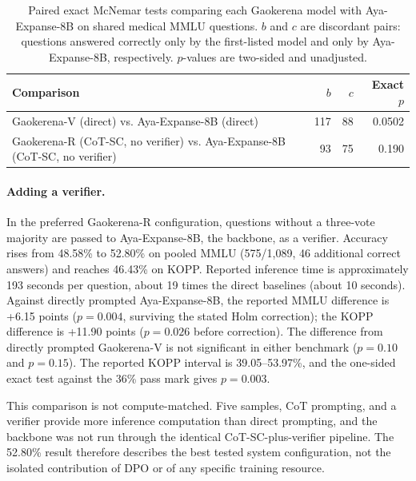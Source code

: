 \documentclass[manuscript,screen,review]{acmart}
\begin{document}
\begin{table}[ht]
\caption{Paired exact McNemar tests comparing each Gaokerena model with Aya-Expanse-8B on shared medical MMLU questions. $b$ and $c$ are discordant pairs: questions answered correctly only by the first-listed model and only by Aya-Expanse-8B, respectively. $p$-values are two-sided and unadjusted.}
\label{tab:mcnemar}
\small
\begin{tabular}{@{}lrrr@{}}
\toprule
Comparison & $b$ & $c$ & Exact $p$ \\
\midrule
Gaokerena-V (direct) vs. Aya-Expanse-8B (direct) & 117 & 88 & 0.0502 \\
Gaokerena-R (CoT-SC, no verifier) vs. Aya-Expanse-8B (CoT-SC, no verifier) & 93 & 75 & 0.190 \\
\bottomrule
\end{tabular}
\end{table}

\paragraph{Adding a verifier.} In the preferred Gaokerena-R configuration, questions without a three-vote majority are passed to Aya-Expanse-8B, the backbone, as a verifier. Accuracy rises from 48.58\% to 52.80\% on pooled MMLU (575/1,089, 46 additional correct answers) and reaches 46.43\% on KOPP. Reported inference time is approximately 193 seconds per question, about 19 times the direct baselines (about 10 seconds). Against directly prompted Aya-Expanse-8B, the reported MMLU difference is +6.15 points ($p=0.004$, surviving the stated Holm correction); the KOPP difference is +11.90 points ($p=0.026$ before correction). The difference from directly prompted Gaokerena-V is not significant in either benchmark ($p=0.10$ and $p=0.15$). The reported KOPP interval is 39.05--53.97\%, and the one-sided exact test against the 36\% pass mark gives $p=0.003$.

This comparison is not compute-matched. Five samples, CoT prompting, and a verifier provide more inference computation than direct prompting, and the backbone was not run through the identical CoT-SC-plus-verifier pipeline. The 52.80\% result therefore describes the best tested system configuration, not the isolated contribution of DPO or of any specific training resource.
\end{document}
